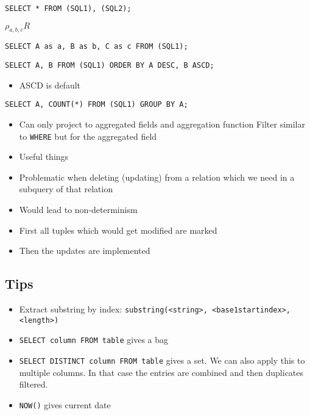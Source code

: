 \begin{itemize}
\begin{itemize}
\begin{verbatim}
SELECT * FROM (SQL1), (SQL2);
\end{verbatim}
             $\rho_{a, b, c}R$
\begin{verbatim}
SELECT A as a, B as b, C as c FROM (SQL1);
\end{verbatim}
        \end{itemize}
\begin{verbatim}
SELECT A, B FROM (SQL1) ORDER BY A DESC, B ASCD;
\end{verbatim}
        \begin{itemize}
            \item ASCD is default
        \end{itemize}
\begin{verbatim}
SELECT A, COUNT(*) FROM (SQL1) GROUP BY A;
\end{verbatim}
        \begin{itemize}
            \item Can only project to aggregated fields and aggregation function
                 Filter similar to \verb+WHERE+ but for the aggregated field
        \end{itemize}
        \begin{itemize}
            \item Useful things
        \end{itemize}
        \begin{itemize}
            \item Problematic when deleting (updating) from a relation which we need in a subquery of that relation
            \item Would lead to non-determinism
            \item First all tuples which would get modified are marked
            \item Then the updates are implemented
        \end{itemize}
\end{itemize}

\subsection{Tips}
\begin{itemize}
    \item Extract substring by index: \verb+substring(<string>, <base1startindex>, <length>)+
    \item \verb+SELECT column FROM table+ gives a bag
    \item \verb+SELECT DISTINCT column FROM table+ gives a set. We can also apply this to multiple columns. In that case the entries are combined and then duplicates filtered.
    \item \verb+NOW()+ gives current date
\end{itemize}

